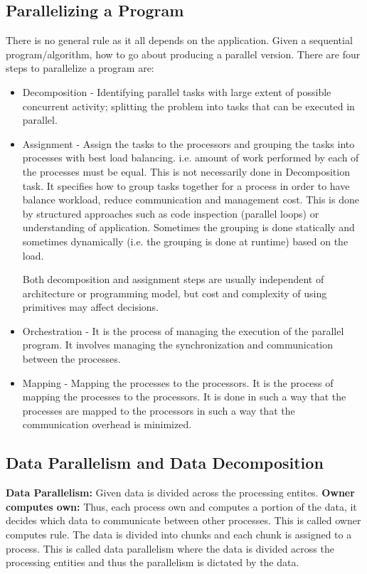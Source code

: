 \documentclass[12pt]{article}
\begin{document}
\subsection{Parallelizing a Program}
There is no general rule as it all depends on the application. Given a sequential program/algorithm, how to go about producing a parallel version. There are four steps to parallelize a program are:
\begin{itemize}
    \item Decomposition - Identifying parallel tasks with large extent of possible concurrent activity; splitting the problem into tasks that can be executed in parallel.
    \item Assignment - Assign the tasks to the processors and grouping the tasks into processes with best load balancing. i.e. amount of work performed by each of the processes must be equal.
    This is not necessarily done in Decomposition task. It specifies how to group tasks together for a process in order to have balance workload, reduce communication and management cost.
    This is done by structured approaches such as code inspection (parallel loops) or understanding of application. Sometimes the grouping is done statically and sometimes dynamically (i.e. the grouping is done at runtime) based on the load.

    Both decomposition and assignment steps are usually independent of architecture or programming model, but cost and complexity of using primitives may affect decisions.
    \item Orchestration - It is the process of managing the execution of the parallel program. It involves managing the synchronization and communication between the processes. 
    \item Mapping - Mapping the processes to the processors. It is the process of mapping the processes to the processors. It is done in such a way that the processes are mapped to the processors in such a way that the communication overhead is minimized.
\end{itemize}
\subsection{Data Parallelism and Data Decomposition}
\textbf{Data Parallelism: }Given data is divided across the processing entites. \textbf{Owner computes own:} Thus, each process own and computes a portion of the data, it decides which data to communicate between other processes.
This is called owner computes rule. The data is divided into chunks and each chunk is assigned to a process. This is called data parallelism where the data is divided across the processing entities and thus the parallelism is dictated by the data. 
\end{document}
